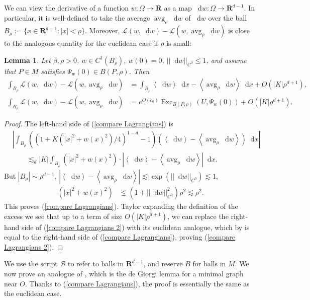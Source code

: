 \documentclass[reqno,10pt]{amsart}
\newcommand{\RR}{\mathbf{R}}
\DeclareMathOperator{\avg}{avg}
\DeclareMathOperator{\Exc}{Exc}
\newcommand*\dif{\mathop{}\!\mathrm{d}}
\newcommand{\Lagrange}{\mathscr L}
\def\Japan#1{\left \langle #1 \right \rangle}
\newtheorem{lemma}[theorem]{Lemma}
\theoremstyle{definition}
\numberwithin{equation}{section}
\begin{document}
We can view the derivative of a function $w: \Omega \to \RR$ as a map $\dif w: \Omega \to \RR^{d - 1}$.
In particular, it is well-defined to take the average $\avg_\rho \dif w$ of $\dif w$ over the ball $B_\rho := \{x \in \RR^{d - 1}: |x| < \rho\}$.
Moreover, $\Lagrange(w, \dif w) - \Lagrange(w, \avg_\rho \dif w)$ is close to the analogous quantity for the euclidean case if $\rho$ is small:

\begin{lemma}
Let $\beta, \rho > 0$, $w \in C^1(B_\rho)$, $w(0) = 0$, $||\dif w||_{C^0} \leq 1$, and assume that $P \in M$ satisfies $\Psi_w(0) \in B(P, \rho)$. Then
\begin{align}
\int_{B_\rho} \Lagrange(w, \dif w) - \Lagrange(w, \avg_\rho \dif w) &= \int_{B_\rho} \Japan{\dif w} \dif x - \Japan{\avg_\rho \dif w} \dif x + O(|K| \rho^{d + 1}) \label{compare Lagrangians}, \\
\int_{B_\rho} \Lagrange(w, \dif w) - \Lagrange(w, \avg_\rho \dif w) &= e^{O(c_0)} \Exc_{B(P, \rho)} (U, \Psi_w(0)) + O(|K| \rho^{d + 1}). \label{compare Lagrangians 2}
\end{align}
\end{lemma}
\begin{proof}
The left-hand side of (\ref{compare Lagrangians}) is
\begin{align*}
&\left|\int_{B_\rho} ((1 + K(|x|^2 + w(x)^2)/4)^{1 - d} - 1)(\Japan{\dif w} - \Japan{\avg_\rho \dif w}) \dif x\right| \\
&\qquad \lesssim_d |K| \int_{B_\rho} (|x|^2 + w(x)^2) \cdot \left|\Japan{\dif w} - \Japan{\avg_\rho \dif w}\right| \dif x.
\end{align*}
But $|B_\rho| \sim \rho^{d - 1}$, $|\Japan{\dif w} - \Japan{\avg_\rho \dif w}| \lesssim \exp(||\dif w||_{C^0}) \lesssim 1$,
\begin{align*}
(|x|^2 + w(x)^2) &\leq (1 + ||\dif w||_{C^0}^2) \rho^2 \lesssim \rho^2.
\end{align*}
This proves (\ref{compare Lagrangians}). Taylor expanding the definition of the excess we see that up to a term of size $O(|K| \rho^{d + 1})$, we can replace the right-hand side of (\ref{compare Lagrangians 2}) with its euclidean analogue, which by \cite[pg83]{Giusti77} is equal to the right-hand side of (\ref{compare Lagrangians}), proving (\ref{compare Lagrangians 2}).
\end{proof}

We use the script $\mathscr B$ to refer to balls in $\RR^{d - 1}$, and reserve $B$ for balls in $M$.
We now prove an analogue of \cite[Lemma 6.3]{Giusti77}, which is the de Giorgi lemma for a minimal graph near $O$.
Thanks to (\ref{compare Lagrangians}), the proof is essentially the same as the euclidean case.
\end{document}
